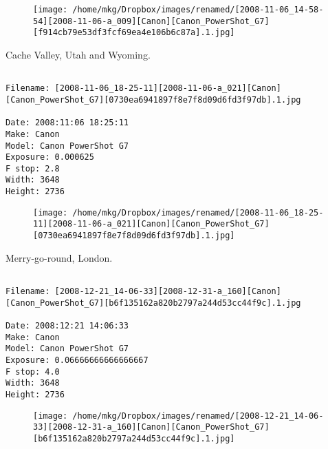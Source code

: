 \begin{figure}
\texttt{[image: /home/mkg/Dropbox/images/renamed/[2008-11-06\_14-58-54][2008-11-06-a\_009][Canon][Canon\_PowerShot\_G7][f914cb79e53df3fcf69ea4e106b6c87a].1.jpg]}
\end{figure}
    
\clearpage
\onecolumn
\noindent Cache Valley, Utah and Wyoming.
\noindent
\begin{lstlisting}

Filename: [2008-11-06_18-25-11][2008-11-06-a_021][Canon][Canon_PowerShot_G7][0730ea6941897f8e7f8d09d6fd3f97db].1.jpg

Date: 2008:11:06 18:25:11
Make: Canon
Model: Canon PowerShot G7
Exposure: 0.000625
F stop: 2.8
Width: 3648
Height: 2736
\end{lstlisting}
\clearpage

\begin{figure}
\texttt{[image: /home/mkg/Dropbox/images/renamed/[2008-11-06\_18-25-11][2008-11-06-a\_021][Canon][Canon\_PowerShot\_G7][0730ea6941897f8e7f8d09d6fd3f97db].1.jpg]}
\end{figure}
    
\clearpage
\onecolumn
\noindent Merry-go-round, London.
\noindent
\begin{lstlisting}

Filename: [2008-12-21_14-06-33][2008-12-31-a_160][Canon][Canon_PowerShot_G7][b6f135162a820b2797a244d53cc44f9c].1.jpg

Date: 2008:12:21 14:06:33
Make: Canon
Model: Canon PowerShot G7
Exposure: 0.06666666666666667
F stop: 4.0
Width: 3648
Height: 2736
\end{lstlisting}
\clearpage

\begin{figure}
\texttt{[image: /home/mkg/Dropbox/images/renamed/[2008-12-21\_14-06-33][2008-12-31-a\_160][Canon][Canon\_PowerShot\_G7][b6f135162a820b2797a244d53cc44f9c].1.jpg]}
\end{figure}
    
